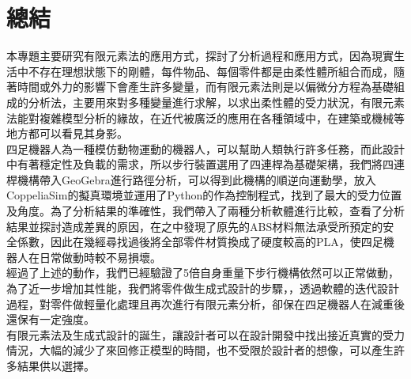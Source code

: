 \chapter{總結}
本專題主要研究有限元素法的應用方式，探討了分析過程和應用方式，因為現實生活中不存在理想狀態下的剛體，每件物品、每個零件都是由柔性體所組合而成，隨著時間或外力的影響下會產生許多變量，而有限元素法則是以偏微分方程為基礎組成的分析法，主要用來對多種變量進行求解，以求出柔性體的受力狀況，有限元素法能對複雜模型分析的緣故，在近代被廣泛的應用在各種領域中，在建築或機械等地方都可以看見其身影。\\

四足機器人為一種模仿動物運動的機器人，可以幫助人類執行許多任務，而此設計中有著穩定性及負載的需求，所以步行裝置選用了四連桿為基礎架構，我們將四連桿機構帶入GeoGebra進行路徑分析，可以得到此機構的順逆向運動學，放入CoppeliaSim的擬真環境並運用了Python的作為控制程式，找到了最大的受力位置及角度。為了分析結果的準確性，我們帶入了兩種分析軟體進行比較，查看了分析結果並探討造成差異的原因，在之中發現了原先的ABS材料無法承受所預定的安全係數，因此在幾經尋找過後將全部零件材質換成了硬度較高的PLA，使四足機器人在日常做動時較不易損壞。\\

經過了上述的動作，我們已經驗證了5倍自身重量下步行機構依然可以正常做動，為了近一步增加其性能，我們將零件做生成式設計的步驟，，透過軟體的迭代設計過程，對零件做輕量化處理且再次進行有限元素分析，卻保在四足機器人在減重後還保有一定強度。\\

有限元素法及生成式設計的誕生，讓設計者可以在設計開發中找出接近真實的受力情況，大幅的減少了來回修正模型的時間，也不受限於設計者的想像，可以產生許多結果供以選擇。\\

\newpage


